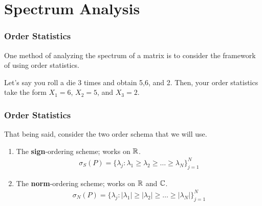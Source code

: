 

\section{Spectrum Analysis}

\begin{frame} \frametitle{Order Statistics}

One method of analyzing the spectrum of a matrix is to consider the framework of using order statistics.

\begin{examples}
Let's say you roll a die 3 times and obtain 5,6, and 2.
Then, your order statistics take the form $X_1 = 6$, $X_2 = 5$, and $X_3 = 2$.
\end{examples}

\end{frame}


\begin{frame} \frametitle{Order Statistics}

That being said, consider the two order schema that we will use.

\begin{enumerate}
  \item The \textbf{sign}-ordering scheme; works on $\mathbb{R}$. \begin{align*}
  \sigma_S(P) = \{\lambda_j : \lambda_1 \geq \lambda_2 \geq \dots \geq \lambda_N\}_{j = 1}^N
  \end{align*}
  \item  The \textbf{norm}-ordering scheme; works on $\mathbb{R}$ and $\mathbb{C}$. \begin{align*}
  \sigma_N(P) = \{\lambda_j : |\lambda_1| \geq |\lambda_2| \geq \dots \geq |\lambda_N|\}_{j = 1}^N
  \end{align*}
\end{enumerate}

\end{frame}

